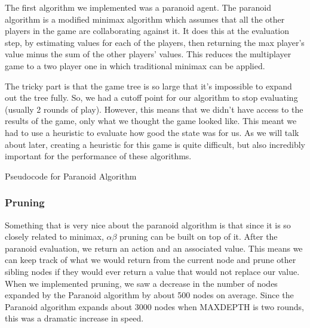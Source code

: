 \documentclass[11pt]{article}
\begin{document}
The first algorithm we implemented was a paranoid agent. The paranoid algorithm is a modified minimax algorithm which assumes that all the other players in the game are collaborating against it. It does this at the evaluation step, by estimating values for each of the players, then returning the max player's value minus the sum of the other players' values. This reduces the multiplayer game to a two player one in which traditional minimax can be applied.

The tricky part is that the game tree is so large that it's impossible to expand out the tree fully. So, we had a cutoff point for our algorithm to stop evaluating (usually 2 rounds of play). However, this means that we didn't have access to the results of the game, only what we thought the game looked like. This meant we had to use a heuristic to evaluate how good the state was for us. As we will talk about later, creating a heuristic for this game is quite difficult, but also incredibly important for the performance of these algorithms.

\begin{algorithm}
  \begin{algorithmic}
	\EndIf
		\EndFor
	\EndIf
		\EndFor
	\EndIf
    \EndProcedure{}
  \end{algorithmic}
  \caption{Pseudocode for Paranoid Algorithm}
\end{algorithm}

\subsubsection{Pruning}

Something that is very nice about the paranoid algorithm is that since it is so closely related to minimax, $\alpha\beta$ pruning can be built on top of it. After the paranoid evaluation, we return an action and an associated value. This means we can keep track of what we would return from the current node and prune other sibling nodes if they would ever return a value that would not replace our value. When we implemented pruning, we saw a decrease in the number of nodes expanded by the Paranoid algorithm by about 500 nodes on average. Since the Paranoid algorithm expands about 3000 nodes when MAXDEPTH is two rounds, this was a dramatic increase in speed.
\end{document}
